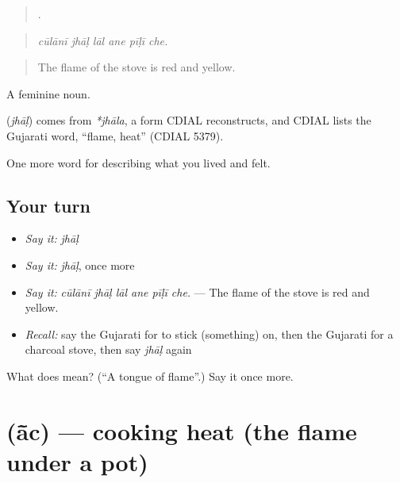 \begin{quote}
     .
\end{quote}

\begin{quote}
\emph{cūlānī jhāḷ lāl ane pīḷī che.}
\end{quote}

\begin{quote}
The flame of the stove is red and yellow.
\end{quote}

A feminine noun.

\begin{cousinweb}
\textbf{} (\emph{jhāḷ}) comes from \emph{*jhāla}, a form CDIAL reconstructs, and CDIAL lists the Gujarati word, \textquotedblleft{}flame, heat\textquotedblright{} (CDIAL 5379).
\end{cousinweb}

\begin{grammarlens}[title={What you've built}]
One more word for describing what you lived and felt.
\end{grammarlens}

\subsection*{Your turn}
\begin{itemize}
\raggedright
  \item \emph{Say it:} \emph{jhāḷ}
  \item \emph{Say it:} \emph{jhāḷ}, once more
  \item \emph{Say it:} \emph{cūlānī jhāḷ lāl ane pīḷī che.} — The flame of the stove is red and yellow.
  \item \emph{Recall:} say the Gujarati for to stick (something) on, then the Gujarati for a charcoal stove, then say \emph{jhāḷ} again
\end{itemize}

\begin{tcolorbox}[breakable,colback=teal!4,colframe=teal!35!black,title={Before you move on}]
What does  mean? (\textquotedblleft{}A tongue of flame\textquotedblright{}.) Say it once more.
\end{tcolorbox}
\section[\texorpdfstring{\gu{આંચ} (ā̃c)}{આંચ (ā̃c)}]{ (ā̃c) — cooking heat (the flame under a pot)}

